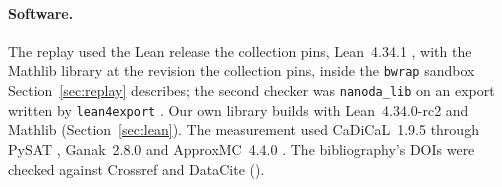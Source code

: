 \paragraph{Software.} The replay used the Lean release the collection
pins, Lean~4.34.1 \citep{MouraUllrich2021}, with the Mathlib library
\citep{Mathlib2020} at the revision the collection pins, inside the
\texttt{bwrap} sandbox Section~\ref{sec:replay} describes; the second
checker was \texttt{nanoda\_lib} \citep{Nanoda} on an export written by
\texttt{lean4export} \citep{Lean4Export}. Our own library builds with
Lean~4.34.0-rc2 and Mathlib (Section~\ref{sec:lean}). The measurement
used CaDiCaL~1.9.5 \citep{Biere2024CaDiCaL} through PySAT
\citep{Ignatiev2018PySAT}, Ganak~2.8.0 \citep{Sharma2019Ganak} and
ApproxMC~4.4.0 \citep{Chakraborty2013ApproxMC, Soos2019BIRD}. The
bibliography's DOIs were checked against Crossref and DataCite
().
